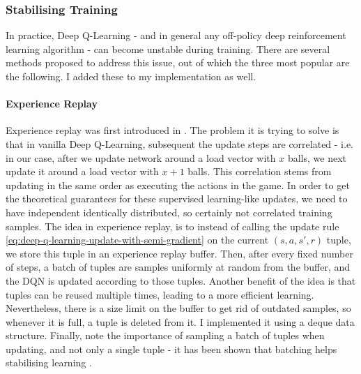 \subsubsection{Stabilising Training}


In practice, Deep Q-Learning - and in general any off-policy deep reinforcement learning algorithm - can become unstable during training. There are several methods proposed to address this issue, out of which the three most popular are the following. I added these to my implementation as well.


\paragraph{Experience Replay}

Experience replay was first introduced in \cite{lin1992experiencereplay}. The problem it is trying to solve is that in vanilla Deep Q-Learning, subsequent the update steps are correlated - i.e. in our case, after we update network around a load vector with $x$ balls, we next update it around a load vector with $x+1$ balls. This correlation stems from updating in the same order as executing the actions in the game. In order to get the theoretical guarantees for these supervised learning-like updates, we need to have independent identically distributed, so certainly not correlated training samples. The idea in experience replay, is to instead of calling the update rule \ref{eq:deep-q-learning-update-with-semi-gradient} on the current $(s, a, s', r)$ tuple, we store this tuple in an experience replay buffer. Then, after every fixed number of steps, a batch of tuples are samples uniformly at random from the buffer, and the DQN is updated according to those tuples. Another benefit of the idea is that tuples can be reused multiple times, leading to a more efficient learning. Nevertheless, there is a size limit on the buffer to get rid of outdated samples, so whenever it is full, a tuple is deleted from it. I implemented it using a deque data structure. Finally, note the importance of sampling a batch of tuples when updating, and not only a single tuple - it has been shown that batching helps stabilising learning \cite{qian2020batchingsgd}.


